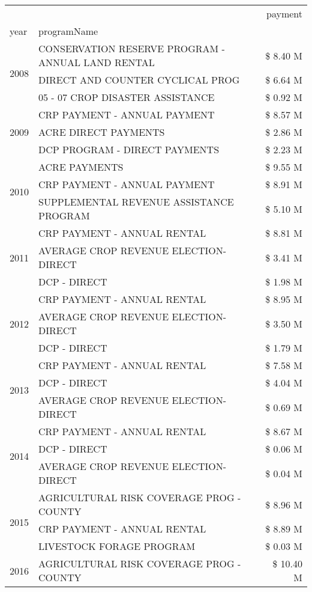 \begin{tabular}{llr}
\toprule
 &  & payment \\
year & programName &  \\
\midrule
\multirow[t]{3}{*}{2008} & CONSERVATION RESERVE PROGRAM - ANNUAL LAND RENTAL & \$ 8.40 M \\
 & DIRECT AND COUNTER CYCLICAL PROG & \$ 6.64 M \\
 & 05 - 07 CROP DISASTER ASSISTANCE & \$ 0.92 M \\
\cline{1-3}
\multirow[t]{3}{*}{2009} & CRP PAYMENT - ANNUAL PAYMENT & \$ 8.57 M \\
 & ACRE DIRECT PAYMENTS & \$ 2.86 M \\
 & DCP PROGRAM - DIRECT PAYMENTS & \$ 2.23 M \\
\cline{1-3}
\multirow[t]{3}{*}{2010} & ACRE PAYMENTS & \$ 9.55 M \\
 & CRP PAYMENT - ANNUAL PAYMENT & \$ 8.91 M \\
 & SUPPLEMENTAL REVENUE ASSISTANCE PROGRAM & \$ 5.10 M \\
\cline{1-3}
\multirow[t]{3}{*}{2011} & CRP PAYMENT - ANNUAL RENTAL & \$ 8.81 M \\
 & AVERAGE CROP REVENUE ELECTION-DIRECT & \$ 3.41 M \\
 & DCP - DIRECT & \$ 1.98 M \\
\cline{1-3}
\multirow[t]{3}{*}{2012} & CRP PAYMENT - ANNUAL RENTAL & \$ 8.95 M \\
 & AVERAGE CROP REVENUE ELECTION-DIRECT & \$ 3.50 M \\
 & DCP - DIRECT & \$ 1.79 M \\
\cline{1-3}
\multirow[t]{3}{*}{2013} & CRP PAYMENT - ANNUAL RENTAL & \$ 7.58 M \\
 & DCP - DIRECT & \$ 4.04 M \\
 & AVERAGE CROP REVENUE ELECTION-DIRECT & \$ 0.69 M \\
\cline{1-3}
\multirow[t]{3}{*}{2014} & CRP PAYMENT - ANNUAL RENTAL & \$ 8.67 M \\
 & DCP - DIRECT & \$ 0.06 M \\
 & AVERAGE CROP REVENUE ELECTION-DIRECT & \$ 0.04 M \\
\cline{1-3}
\multirow[t]{3}{*}{2015} & AGRICULTURAL RISK COVERAGE PROG - COUNTY & \$ 8.96 M \\
 & CRP PAYMENT - ANNUAL RENTAL & \$ 8.89 M \\
 & LIVESTOCK FORAGE PROGRAM & \$ 0.03 M \\
\cline{1-3}
\multirow[t]{3}{*}{2016} & AGRICULTURAL RISK COVERAGE PROG - COUNTY & \$ 10.40 M \\

\end{tabular}
